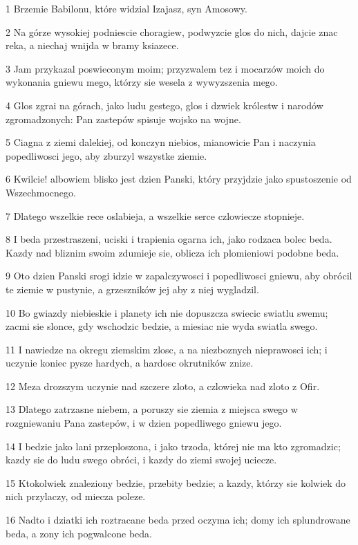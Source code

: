 \par 1 Brzemie Babilonu, które widzial Izajasz, syn Amosowy.
\par 2 Na górze wysokiej podniescie choragiew, podwyzcie glos do nich, dajcie znac reka, a niechaj wnijda w bramy ksiazece.
\par 3 Jam przykazal poswieconym moim; przyzwalem tez i mocarzów moich do wykonania gniewu mego, którzy sie wesela z wywyzszenia mego.
\par 4 Glos zgrai na górach, jako ludu gestego, glos i dzwiek królestw i narodów zgromadzonych: Pan zastepów spisuje wojsko na wojne.
\par 5 Ciagna z ziemi dalekiej, od konczyn niebios, mianowicie Pan i naczynia popedliwosci jego, aby zburzyl wszystke ziemie.
\par 6 Kwilcie! albowiem blisko jest dzien Panski, który przyjdzie jako spustoszenie od Wszechmocnego.
\par 7 Dlatego wszelkie rece oslabieja, a wszelkie serce czlowiecze stopnieje.
\par 8 I beda przestraszeni, uciski i trapienia ogarna ich, jako rodzaca bolec beda. Kazdy nad bliznim swoim zdumieje sie, oblicza ich plomieniowi podobne beda.
\par 9 Oto dzien Panski srogi idzie w zapalczywosci i popedliwosci gniewu, aby obrócil te ziemie w pustynie, a grzeszników jej aby z niej wygladzil.
\par 10 Bo gwiazdy niebieskie i planety ich nie dopuszcza swiecic swiatlu swemu; zacmi sie slonce, gdy wschodzic bedzie, a miesiac nie wyda swiatla swego.
\par 11 I nawiedze na okregu ziemskim zlosc, a na niezboznych nieprawosci ich; i uczynie koniec pysze hardych, a hardosc okrutników znize.
\par 12 Meza drozszym uczynie nad szczere zloto, a czlowieka nad zloto z Ofir.
\par 13 Dlatego zatrzasne niebem, a poruszy sie ziemia z miejsca swego w rozgniewaniu Pana zastepów, i w dzien popedliwego gniewu jego.
\par 14 I bedzie jako lani przeploszona, i jako trzoda, której nie ma kto zgromadzic; kazdy sie do ludu swego obróci, i kazdy do ziemi swojej uciecze.
\par 15 Ktokolwiek znaleziony bedzie, przebity bedzie; a kazdy, którzy sie kolwiek do nich przylaczy, od miecza poleze.
\par 16 Nadto i dziatki ich roztracane beda przed oczyma ich; domy ich splundrowane beda, a zony ich pogwalcone beda.

